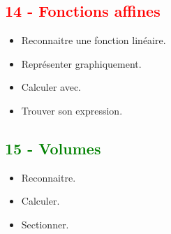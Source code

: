 \documentclass[11pt]{article}
\begin{document}
\begin{multicols}{2}
\subsection*{\textcolor{red}{14 - Fonctions affines}}

\begin{itemize}
\item Reconnaitre une fonction linéaire.
\item Représenter graphiquement. 
\item Calculer avec.
\item Trouver son expression.
\end{itemize}

\subsection*{\textcolor{green}{15 - Volumes}}

\begin{itemize}
\item Reconnaitre.
\item Calculer.
\item Sectionner.
\end{itemize}

\end{multicols}
\end{document}
